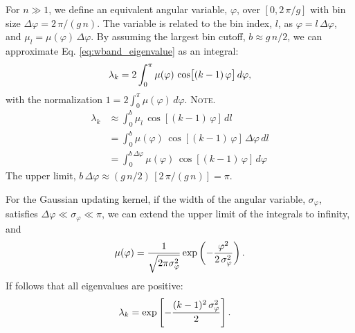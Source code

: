 \documentclass[reprint, superscriptaddress, floatfix]{revtex4-1}
\newcommand{\note}[1]{{\color{DarkGreen}\footnotesize \textsc{Note.} #1}}
\begin{document}
For $n \gg 1$,
we define an equivalent angular variable, $\varphi$,
over $[0, 2 \, \pi/g]$
with bin size
$\Delta \varphi = 2 \, \pi/(g \, n)$.
The variable is related to the bin index, $l$, as
$\varphi = l \, \Delta \varphi$,
and
$\mu_l = \mu(\varphi) \, \Delta \varphi$.
%
By assuming the largest bin cutoff, $b \approx g \, n/2$,
we can approximate Eq. \eqref{eq:wband_eigenvalue}
as an integral:
%
\begin{equation}
  \lambda_k
  =
  2 \int_0^\pi
    \mu(\varphi) \, \cos \bigl[ (k-1) \, \varphi \bigr] \, d\varphi,
\notag
\end{equation}
%
with the normalization
%
$
  1 = 2 \int_0^\pi \mu(\varphi) \, d\varphi.
$
\note{
\begin{align*}
  \lambda_k
  &\approx
  \int_0^b \mu_l \, \cos[(k-1) \, \varphi] \, dl
  \\
  &=
  \int_0^b \mu(\varphi) \, \cos[(k-1) \, \varphi] \, \Delta \varphi \, dl
  \\
  &=
  \int_0^{b \, \Delta \varphi} \mu(\varphi) \, \cos[(k-1) \, \varphi] \, d\varphi
\end{align*}
The upper limit,
$b \, \Delta \varphi \approx (g\,n/2) \, [2\,\pi/(g\,n)] = \pi$.
}

For the Gaussian updating kernel,
if the width of the angular variable, $\sigma_\varphi$,
satisfies $\Delta \varphi \ll \sigma_\varphi \ll \pi$,
we can extend
the upper limit of the integrals
to infinity, and
%
\begin{equation}
  \mu(\varphi)
  =
  \frac{            1            }
       { \sqrt{ 2 \pi \sigma_\varphi^2 } }
  \exp\left(
        -\frac{   \varphi^2   }
              { 2 \, \sigma_\varphi^2 }
      \right)
  .
\notag
\end{equation}
%
%
If follows that all eigenvalues are positive\cite{bussi2006}:
%
\begin{align}
  \lambda_k
  &=
  \exp\left[
        -\frac{ (k - 1)^2 \, \sigma_\varphi^2 }
              {           2           }
      \right]
  .
\notag
\end{align}
\end{document}
